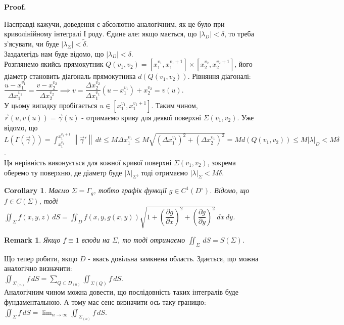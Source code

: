 \documentclass[a4paper, 10pt]{article}
\makeatletter
\def\departial#1#2{\dfrac{\partial {#1}}{\partial {#2}}}
\def\qed{$\blacksquare$}
\theoremstyle{theoremdd}
\theoremstyle{theoremdd}
\theoremstyle{theoremdd}
\theoremstyle{theoremdd}
\theoremstyle{theoremdd}
\theoremstyle{theoremdd}
\newtheorem{remark}[theorem]{Remark}
\theoremstyle{theoremdd}
\theoremstyle{theoremdd}
\newtheorem{corollary}[theorem]{Corollary}
\renewenvironment{proof}[1][Proof.\\]{\par
\pushQED{\hfill \qed}%
\normalfont \topsep6\p@\@plus6\p@\relax
\trivlist
\item\relax
{\bfseries
#1\@addpunct{.}}\hspace\labelsep\ignorespaces
}{%
\popQED\endtrivlist\@endpefalse
}
\newcommand\Norm[1]{\left\lVert#1\right\rVert}
\makeatother
\begin{document}
\begin{proof}
Насправді кажучи, доведення є абсолютно аналогічним, як це було при криволінійному інтегралі І роду. Єдине але: якщо мається, що $|\lambda_D| < \delta$, то треба з'ясувати, чи буде $|\lambda_\Sigma| < \tilde{\delta}$.\\
Заздалегідь нам буде відомо, що $|\lambda_D| < \delta$.\\
Розглянемо якийсь прямокутник $Q(v_1,v_2) = \left[ x_1^{v_1}, x_1^{v_1+1} \right] \times \left[ x_2^{v_2}, x_2^{v_2+1} \right]$, його діаметр становить діагональ прямокутника $d(Q(v_1,v_2))$. Рівняння діагоналі:\\
$\dfrac{u-x_1^{v_1}}{\Delta x_1^{v_1}} = \dfrac{v - x_2^{v_2}}{\Delta x_2^{v_2}} \implies v = \dfrac{\Delta x_2^{v_2}}{\Delta x_1^{v_1}} (u-x_1^{v_1}) + x_2^{v_2} = v(u)$.\\
У цьому випадку пробігається $u \in [x_1^{v_1}, x_1^{v_1+1}]$. Таким чином, $\vec{r}(u,v(u)) = \vec{\gamma}(u)$ - отримаємо криву для деякої поверхні $\Sigma(v_1,v_2)$. Уже відомо, що\\
$L(\Gamma(\vec{\gamma})) = \displaystyle\int_{x_{1}^{v_1}}^{x_1^{v_1+1}} \Norm{ \vec{\gamma}' }\,dt \leq M \Delta x_1^{v_1} \leq M \sqrt{(\Delta x_1^{v_1})^2+(\Delta x_2^{v_1})^2} = M d(Q(v_1,v_2)) \leq M |\lambda|_D < M\delta$.\\
Ця нерівність виконується для кожної кривої поверхні $\Sigma(v_1,v_2)$, зокрема оберемо ту поверхню, де діаметр буде $|\lambda|_{\Sigma}$, тоді отримаємо $|\lambda|_{\Sigma} < M\delta$.
\end{proof}

\begin{corollary}
Маємо $\Sigma = \Gamma_g$, тобто графік функції $g \in C^1(D^\circ)$. Відомо, що $f \in C(\Sigma)$, тоді\\
$\displaystyle\iint_\Sigma f(x,y,z)\,dS = \iint_D f(x,y,g(x,y)) \sqrt{1+\left(\departial{g}{x}\right)^2 + \left(\departial{g}{y}\right)^2}\,dx\,dy$.
\end{corollary}

\begin{remark}
Якщо $f \equiv 1$ всюди на $\Sigma$, то тоді отримаємо $\displaystyle\iint_\Sigma \,dS = S(\Sigma)$.
\end{remark}

Що тепер робити, якщо $D$ - якась довільна замкнена область. Здається, що можна аналогічно визначити:\\
$\displaystyle\iint_{\Sigma_{(n)}} f\,dS = \sum_{Q \subset D_{(n)}} \iint_{\Sigma(Q)} f\,dS$.\\
Аналогічним чином можна довести, що послідовність таких інтегралів буде фундаментальною. А тому має сенс визначити ось таку границю:\\
$\displaystyle\iint_{\Sigma} f\,dS = \lim_{n \to \infty} \iint_{\Sigma_{(n)}} f\,dS$.
\end{document}
